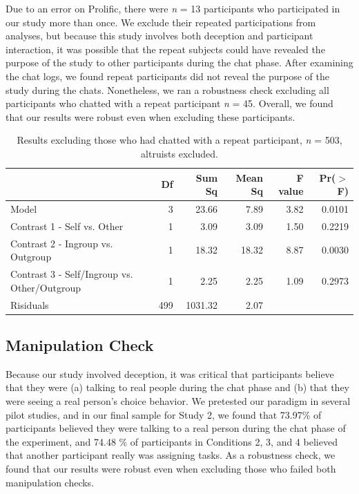 \documentclass[12pt,]{article}
\begin{document}
Due to an error on Prolific, there were \emph{n} = 13 participants who participated in our study more than once. We exclude their repeated participations from analyses, but because this study involves both deception and participant interaction, it was possible that the repeat subjects could have revealed the purpose of the study to other participants during the chat phase. After examining the chat logs, we found repeat participants did not reveal the purpose of the study during the chats. Nonetheless, we ran a robustness check excluding all participants who chatted with a repeat participant \emph{n} = 45. Overall, we found that our results were robust even when excluding these participants.  

\vspace{0.6cm}

\begin{table}[ht]
\centering
\begin{tabular}{lrrrrr}
  \hline
 & Df & Sum Sq & Mean Sq & F value & Pr($>$F) \\ 
  \hline
Model & 3 & 23.66 & 7.89 & 3.82 & 0.0101 \\ 
  Contrast 1 - Self vs. Other & 1 & 3.09 & 3.09 & 1.50 & 0.2219 \\ 
  Contrast 2 - Ingroup vs. Outgroup & 1 & 18.32 & 18.32 & 8.87 & 0.0030 \\ 
  Contrast 3 - Self/Ingroup vs. Other/Outgroup & 1 & 2.25 & 2.25 & 1.09 & 0.2973 \\ 
  Risiduals & 499 & 1031.32 & 2.07 &  &  \\ 
   \hline
\end{tabular}
\caption{Results excluding those who had chatted with a repeat participant, \emph{n} = 503, altruists excluded.} 
\label{repeats}
\end{table}


\newpage
\subsection{Manipulation Check}
\label{appendix:manip2}

Because our study involved deception, it was critical that participants believe that they were (a) talking to real people during the chat phase and (b) that they were seeing a real person's choice behavior. We pretested our paradigm in several pilot studies, and in our final sample for Study 2, we found that  73.97\% of participants believed they were talking to a real person during the chat phase of the experiment, and 74.48 \% of participants in Conditions 2, 3, and 4 believed that another participant really was assigning tasks. As a robustness check, we found that our results were robust even when excluding those who failed both manipulation checks. 
\end{document}
